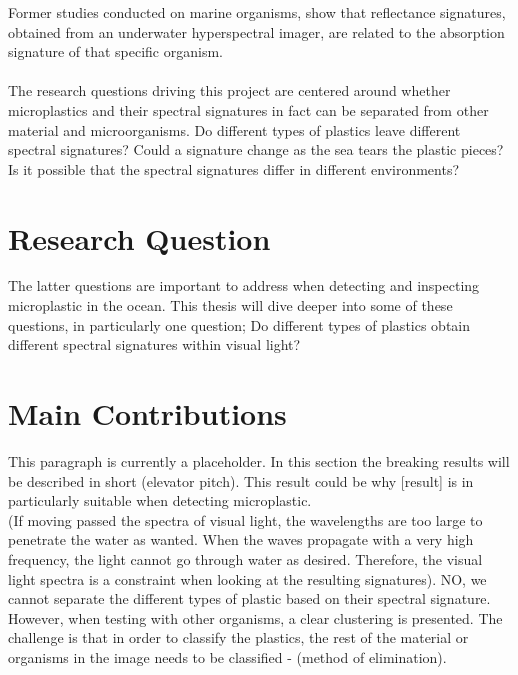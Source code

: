 Former studies conducted on marine organisms, show that reflectance signatures, obtained from an underwater hyperspectral imager, are related to the absorption signature of that specific organism. %
\\\\
The research questions driving this project are centered around whether microplastics and their spectral signatures in fact can be separated from other material and microorganisms. Do different types of plastics leave different spectral signatures? Could a signature change as the sea tears the plastic pieces? Is it possible that the spectral signatures differ in different environments?

\section{Research Question}
The latter questions are important to address when detecting and inspecting microplastic in the ocean. This thesis will dive deeper into some of these questions, in particularly one question; Do different types of plastics obtain different spectral signatures within visual light?

\section{Main Contributions} This paragraph is currently a placeholder. In this section the breaking results will be described in short (elevator pitch). This result could be why [result] is in particularly suitable when detecting microplastic.
\\
(If moving passed the spectra of visual light, the wavelengths are too large to penetrate the water as wanted. When the waves propagate with a very high frequency, the light cannot go through water as desired. Therefore, the visual light spectra is a constraint when looking at the resulting signatures). NO, we cannot separate the different types of plastic based on their spectral signature. However, when testing with other organisms, a clear clustering is presented. The challenge is that in order to classify the plastics, the rest of the material or organisms in the image needs to be classified - (method of elimination). 

